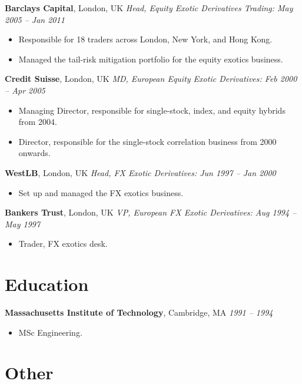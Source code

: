 \documentclass[11pt,oneside]{article}\usepackage[]{graphicx}\usepackage[]{xcolor}
\begin{document}
\textbf{Barclays Capital}, London, UK \hfill \emph{Head, Equity Exotic Derivatives Trading: May 2005 -- Jan 2011}\par
\begin{itemize}
  \item Responsible for 18 traders across London, New York, and Hong Kong.
  \item Managed the tail-risk mitigation portfolio for the equity exotics business.
\end{itemize}

\textbf{Credit Suisse}, London, UK \hfill \emph{MD, European Equity Exotic Derivatives: Feb 2000 -- Apr 2005}\par
\begin{itemize}
  \item Managing Director, responsible for single-stock, index, and equity hybrids from 2004.
  \item Director, responsible for the single-stock correlation business from 2000 onwards.
\end{itemize}

\textbf{WestLB}, London, UK \hfill \emph{Head, FX Exotic Derivatives: Jun 1997 -- Jan 2000}\par
\begin{itemize}
  \item Set up and managed the FX exotics business.
\end{itemize}

\textbf{Bankers Trust}, London, UK \hfill \emph{VP, European FX Exotic Derivatives: Aug 1994 -- May 1997}\par
\begin{itemize}
  \item Trader, FX exotics desk.
\end{itemize}

\section*{Education}

\textbf{Massachusetts Institute of Technology}, Cambridge, MA \hfill \emph{1991 -- 1994}\par
\begin{itemize}
  \item MSc Engineering.
\end{itemize}

\section*{Other}
\end{document}
